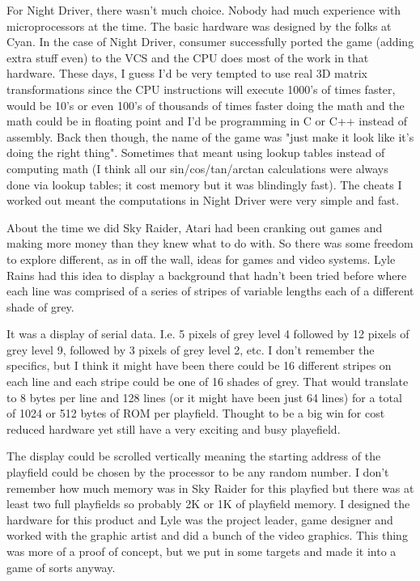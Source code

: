 For Night Driver, there wasn't much choice. Nobody had much experience with microprocessors at the time. The basic hardware was designed by the folks at Cyan. In the case of Night Driver, consumer successfully ported the game (adding extra stuff even) to the VCS and the CPU does most of the work in that hardware. These days, I guess I'd be very tempted to use real 3D matrix transformations since the CPU instructions will execute 1000's of times faster, would be 10's or even 100's of thousands of times faster doing the math and the math could be in floating point and I'd be programming in C or C++ instead of assembly. Back then though, the name of the game was "just make it look like it's doing the right thing". Sometimes that meant using lookup tables instead of computing math (I think all our sin/cos/tan/arctan calculations were always done via lookup tables; it cost memory but it was blindingly fast). The cheats I worked out meant the computations in Night Driver were very simple and fast.

About the time we did Sky Raider, Atari had been cranking out games and making more money than they knew what to do with. So there was some freedom to explore different, as in off the wall, ideas for games and video systems. Lyle Rains had this idea to display a background that hadn't been tried before where each line was comprised of a series of stripes of variable lengths each of a different shade of grey. 

It was a display of serial data. I.e. 5 pixels of grey level 4 followed by 12 pixels of grey level 9, followed by 3 pixels of grey level 2, etc. I don't remember the specifics, but I think it might have been there could be 16 different stripes on each line and each stripe could be one of 16 shades of grey. That would translate to 8 bytes per line and 128 lines (or it might have been just 64 lines) for a total of 1024 or 512 bytes of ROM per playfield. Thought to be a big win for cost reduced hardware yet still have a very exciting and busy playefield.

The display could be scrolled vertically meaning the starting address of the playfield could be chosen by the processor to be any random number. I don't remember how much memory was in Sky Raider for this playfied but there was at least two full playfields so probably 2K or 1K of playfield memory. I designed the hardware for this product and Lyle was the project leader, game designer and worked with the graphic artist and did a bunch of the video graphics. This thing was more of a proof of concept, but we put in some targets and made it into a game of sorts anyway. 

